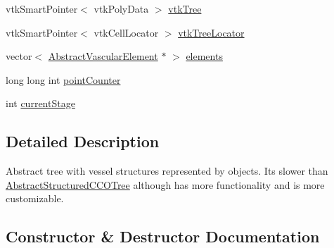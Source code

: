 \begin{DoxyCompactItemize}
vtk\+Smart\+Pointer$<$ vtk\+Poly\+Data $>$ \hyperlink{class_abstract_object_c_c_o_tree_a241465d780d31882e94993abc0acb3af}{vtk\+Tree}
\item 
vtk\+Smart\+Pointer$<$ vtk\+Cell\+Locator $>$ \hyperlink{class_abstract_object_c_c_o_tree_ad46c9e54e0a3093cbd5968ee7f2fa71a}{vtk\+Tree\+Locator}
\item 
vector$<$ \hyperlink{class_abstract_vascular_element}{Abstract\+Vascular\+Element} $\ast$ $>$ \hyperlink{class_abstract_object_c_c_o_tree_a1a5790a267dd42e96d0dec9d60808be8}{elements}
\item 
long long int \hyperlink{class_abstract_object_c_c_o_tree_a8d8512b976d31017c242e229dafebd0a}{point\+Counter}
\item 
int \hyperlink{class_abstract_object_c_c_o_tree_a3597fe2e3dd70d3da743674eb91c2831}{current\+Stage}
\end{DoxyCompactItemize}


\subsection{Detailed Description}
Abstract tree with vessel structures represented by objects. Its slower than \hyperlink{class_abstract_structured_c_c_o_tree}{Abstract\+Structured\+C\+C\+O\+Tree} although has more functionality and is more customizable. 

\subsection{Constructor \& Destructor Documentation}

